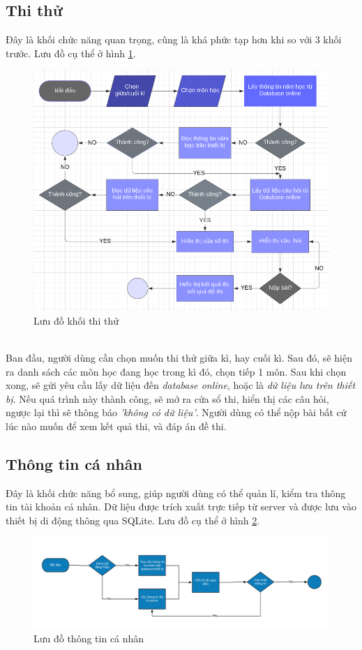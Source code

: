 \documentclass[a4paper]{article}
\begin{document}
\subsection{Thi thử}
\hspace*{.5 cm} Đây là khối chức năng quan trọng, cũng là khá phức tạp hơn khi so với 3 khối trước. Lưu đồ cụ thể ở hình \ref{test}.
\begin{figure}[h!]
    \centering
    \includegraphics[scale=.4]{test.png}
    \caption{Lưu đồ khối thi thử}
    \label{test}
\end{figure}\\
\hspace*{0.5 cm}Ban đầu, người dùng cần chọn muốn thi thử giữa kì, hay cuối kì. Sau đó, sẽ hiện ra danh sách các môn học đang học trong kì đó, chọn tiếp 1 môn. Sau khi chọn xong, sẽ gửi yêu cầu lấy dữ liệu đến \textit{database online}, hoặc là \textit{dữ liệu lưu trên thiết bị}. Nếu quá trình này thành công, sẽ mở ra cửa sổ thi, hiển thị các câu hỏi, ngược lại thì sẽ thông báo \textit{'không có dữ liệu'}. Người dùng có thể nộp bài bất cứ lúc nào muốn để xem kết quả thi, và đáp án đề thi.
\subsection{Thông tin cá nhân}
\hspace*{0.5cm} Đây là khối chức năng bổ sung, giúp người dùng có thể quản lí, kiểm tra thông tin tài khoản cá nhân. Dữ liệu được trích xuất trực tiếp từ server và được lưu vào thiết bị di động thông qua SQLite. Lưu đồ cụ thể ở hình \ref{infoSV}.
\begin{figure}[h!]
    \centering
    \includegraphics[scale=.4]{thong_tin_ca_nhan.PNG}
    \caption{Lưu đồ thông tin cá nhân}
    \label{infoSV}
\end{figure}\\
\end{document}
